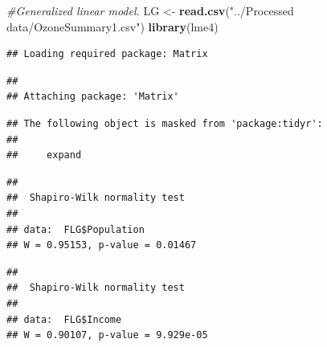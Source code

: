 \documentclass[12pt,]{article}
\newenvironment{Shaded}{\begin{snugshade}}{\end{snugshade}}
\newcommand{\KeywordTok}[1]{\textcolor[rgb]{0.13,0.29,0.53}{\textbf{#1}}}
\newcommand{\StringTok}[1]{\textcolor[rgb]{0.31,0.60,0.02}{#1}}
\newcommand{\CommentTok}[1]{\textcolor[rgb]{0.56,0.35,0.01}{\textit{#1}}}
\newcommand{\OperatorTok}[1]{\textcolor[rgb]{0.81,0.36,0.00}{\textbf{#1}}}
\newcommand{\NormalTok}[1]{#1}
\begin{document}
\begin{Shaded}
\begin{Highlighting}[]
\CommentTok{#Generalized linear model.}
\NormalTok{LG <-}\StringTok{ }\KeywordTok{read.csv}\NormalTok{(}\StringTok{"../Processed data/OzoneSummary1.csv"}\NormalTok{)}
\KeywordTok{library}\NormalTok{(lme4)}
\end{Highlighting}
\end{Shaded}

\begin{verbatim}
## Loading required package: Matrix
\end{verbatim}

\begin{verbatim}
## 
## Attaching package: 'Matrix'
\end{verbatim}

\begin{verbatim}
## The following object is masked from 'package:tidyr':
## 
##     expand
\end{verbatim}

\begin{Shaded}
\end{Shaded}

\begin{verbatim}
## 
##  Shapiro-Wilk normality test
## 
## data:  FLG$Population
## W = 0.95153, p-value = 0.01467
\end{verbatim}

\begin{Shaded}
\end{Shaded}

\begin{verbatim}
## 
##  Shapiro-Wilk normality test
## 
## data:  FLG$Income
## W = 0.90107, p-value = 9.929e-05
\end{verbatim}

\begin{Shaded}
\end{Shaded}
\end{document}
